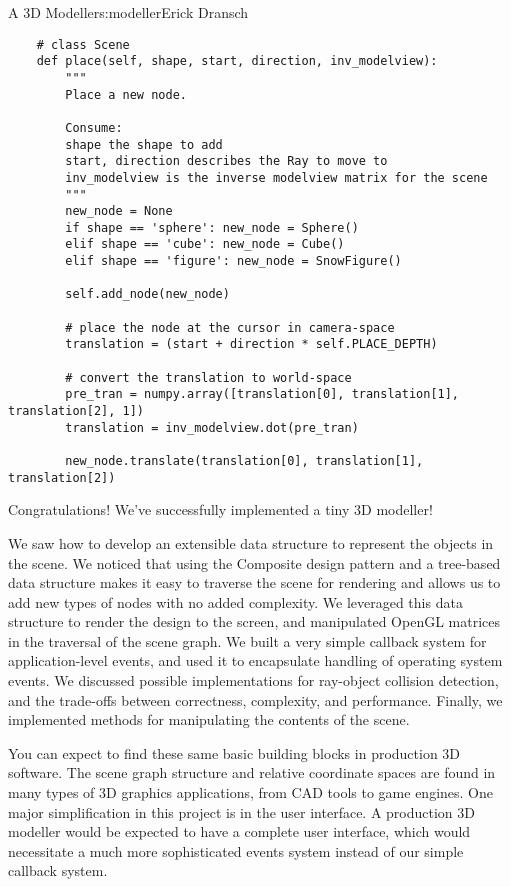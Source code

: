 \begin{aosachapter}{A 3D Modeller}{s:modeller}{Erick Dransch}
\begin{verbatim}
    # class Scene
    def place(self, shape, start, direction, inv_modelview):
        """ 
        Place a new node.
            
        Consume:  
        shape the shape to add
        start, direction describes the Ray to move to
        inv_modelview is the inverse modelview matrix for the scene 
        """
        new_node = None
        if shape == 'sphere': new_node = Sphere()
        elif shape == 'cube': new_node = Cube()
        elif shape == 'figure': new_node = SnowFigure()
    
        self.add_node(new_node)
    
        # place the node at the cursor in camera-space
        translation = (start + direction * self.PLACE_DEPTH)
    
        # convert the translation to world-space
        pre_tran = numpy.array([translation[0], translation[1], translation[2], 1])
        translation = inv_modelview.dot(pre_tran)
    
        new_node.translate(translation[0], translation[1], translation[2])
\end{verbatim}

\label{summary}

Congratulations! We've successfully implemented a tiny 3D modeller!


We saw how to develop an extensible data structure to represent the
objects in the scene. We noticed that using the Composite design pattern
and a tree-based data structure makes it easy to traverse the scene for
rendering and allows us to add new types of nodes with no added
complexity. We leveraged this data structure to render the design to the
screen, and manipulated OpenGL matrices in the traversal of the scene
graph. We built a very simple callback system for application-level
events, and used it to encapsulate handling of operating system events.
We discussed possible implementations for ray-object collision
detection, and the trade-offs between correctness, complexity, and
performance. Finally, we implemented methods for manipulating the
contents of the scene.

You can expect to find these same basic building blocks in production 3D
software. The scene graph structure and relative coordinate spaces are
found in many types of 3D graphics applications, from CAD tools to game
engines. One major simplification in this project is in the user
interface. A production 3D modeller would be expected to have a complete
user interface, which would necessitate a much more sophisticated events
system instead of our simple callback system.


\end{aosachapter}

